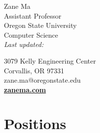 \documentclass[10pt,singlecolumn]{article} %
\def\parsedate #1:20#2#3#4#5#6#7#8\empty{20#2#3/#4#5/#6#7}
\def\moddate#1{\expandafter\parsedate\pdffilemoddate{#1}\empty}
\begin{document}
\color{text1} %

\begin{minipage}[t]{0.5\textwidth}
{\Huge Zane Ma} \vspace{0.5cm}\\ %
Assistant Professor  \\
Oregon State University \\
Computer Science \\
\emph{Last updated: \moddate{\jobname.tex}}

\end{minipage}
\begin{minipage}[t]{0.5\textwidth}
\begin{flushright}
\vspace{\baselineskip}
3079 Kelly Engineering Center \\
Corvallis, OR 97331 \\
zane.ma@oregonstate.edu \\ 
\textbf{\href{https://zanema.com}{zanema.com}}
\end{flushright}
\end{minipage}





\vspace{0.3cm}
\section{Positions}
\end{document}
